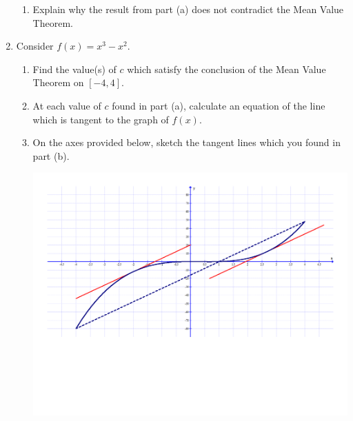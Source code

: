 \documentclass[12pt]{article}
\newif\ifans
\begin{document}
\begin{enumerate}
\begin{enumerate}
\item Explain why the result from part (a) does not contradict the Mean Value Theorem.

\ifans{\fbox{\parbox{1\linewidth}{$f(x)$ is not differentiable at $x=0$ which is in $(-8,1)$.  Thus, the Mean Value Theorem does not apply.}}}\fi

\end{enumerate}

\newpage

\item Consider $f(x)=x^3-x^2$.

\begin{enumerate}

\item Find the value(s) of $c$ which satisfy the conclusion of the Mean Value Theorem on $[-4,4]$.

\ifans{\fbox{$c=-2$ or $c=\frac{8}{3}$}}\fi

\item At each value of $c$ found in part (a), calculate an equation of the line which is tangent to the graph of $f(x)$.

\ifans{\fbox{$y=16x-20$; $y=16x-\frac{832}{27}$}}\fi

\item On the axes provided below, sketch the tangent lines which you found in part (b).

\begin{center}
\includegraphics[scale=0.4]{grapha.pdf}
\end{center}

\end{enumerate}


\end{enumerate}
\end{document}
